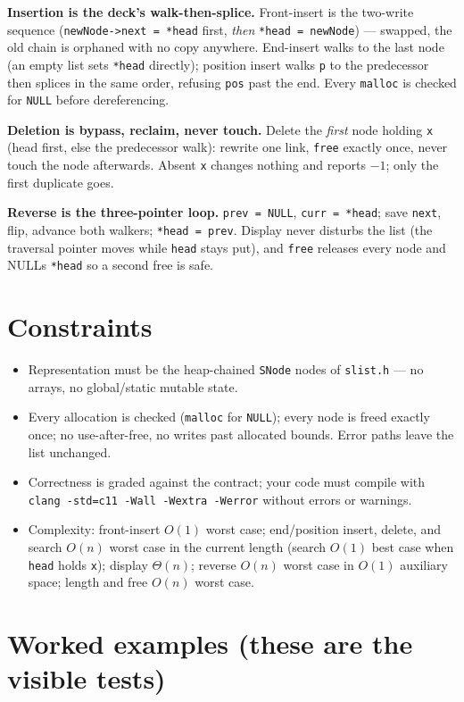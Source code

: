 \documentclass[11pt]{article}
\begin{document}
\textbf{Insertion is the deck's walk-then-splice.} Front-insert is the two-write sequence (\texttt{newNode->next = *head} first, \emph{then} \texttt{*head = newNode}) --- swapped, the old chain is orphaned with no copy anywhere. End-insert walks to the last node (an empty list sets \texttt{*head} directly); position insert walks \texttt{p} to the predecessor then splices in the same order, refusing \texttt{pos} past the end. Every \texttt{malloc} is checked for \texttt{NULL} before dereferencing.

\textbf{Deletion is bypass, reclaim, never touch.} Delete the \emph{first} node holding \texttt{x} (head first, else the predecessor walk): rewrite one link, \texttt{free} exactly once, never touch the node afterwards. Absent \texttt{x} changes nothing and reports $-1$; only the first duplicate goes.

\textbf{Reverse is the three-pointer loop.} \texttt{prev = NULL}, \texttt{curr = *head}; save \texttt{next}, flip, advance both walkers; \texttt{*head = prev}. Display never disturbs the list (the traversal pointer moves while \texttt{head} stays put), and \texttt{free} releases every node and NULLs \texttt{*head} so a second free is safe.

\section{Constraints}

\begin{itemize}
  \item Representation must be the heap-chained \texttt{SNode} nodes of \texttt{slist.h} --- no arrays, no global/static mutable state.
  \item Every allocation is checked (\texttt{malloc} for \texttt{NULL}); every node is freed exactly once; no use-after-free, no writes past allocated bounds. Error paths leave the list unchanged.
  \item Correctness is graded against the contract; your code must compile with \texttt{clang -std=c11 -Wall -Wextra -Werror} without errors or warnings.
  \item Complexity: front-insert $O(1)$ worst case; end/position insert, delete, and search $O(n)$ worst case in the current length (search $O(1)$ best case when \texttt{head} holds \texttt{x}); display $\Theta(n)$; reverse $O(n)$ worst case in $O(1)$ auxiliary space; length and free $O(n)$ worst case.
\end{itemize}

\section{Worked examples (these are the visible tests)}
\end{document}
